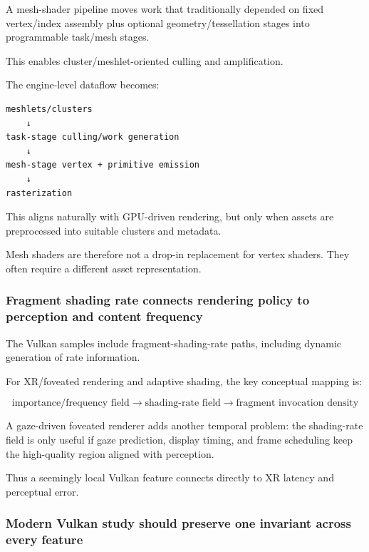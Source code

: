 A mesh-shader pipeline moves work that traditionally depended on fixed vertex/index assembly plus optional geometry/tessellation stages into programmable task/mesh stages.

This enables cluster/meshlet-oriented culling and amplification.

The engine-level dataflow becomes:

\begin{verbatim}
meshlets/clusters
    ↓
task-stage culling/work generation
    ↓
mesh-stage vertex + primitive emission
    ↓
rasterization
\end{verbatim}

This aligns naturally with GPU-driven rendering, but only when assets are preprocessed into suitable clusters and metadata.

Mesh shaders are therefore not a drop-in replacement for vertex shaders. They often require a different asset representation.

\subsubsection{Fragment shading rate connects rendering policy to perception and content frequency}\label{05-engine-i-ch023-fragment-shading-rate-connects-rendering-policy-to-perception-and-content-frequency}

The Vulkan samples include fragment-shading-rate paths, including dynamic generation of rate information.

For XR/foveated rendering and adaptive shading, the key conceptual mapping is:

\[
\text{importance/frequency field}
\rightarrow
\text{shading-rate field}
\rightarrow
\text{fragment invocation density}
\]

A gaze-driven foveated renderer adds another temporal problem: the shading-rate field is only useful if gaze prediction, display timing, and frame scheduling keep the high-quality region aligned with perception.

Thus a seemingly local Vulkan feature connects directly to XR latency and perceptual error.

\subsubsection{Modern Vulkan study should preserve one invariant across every feature}\label{05-engine-i-ch023-modern-vulkan-study-should-preserve-one-invariant-across-every-feature}


